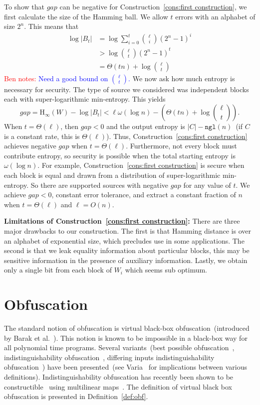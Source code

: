 \documentclass[11pt]{article}
\newcommand{\defref}[1]{\mbox{Definition~\ref{#1}}}
\newcommand{\consref}[1]{\mbox{Construction~\ref{#1}}}
\newcommand{\ngl}{\ensuremath{\mathtt{ngl}}\xspace}
\newcommand{\Hoo}{\mathrm{H}_\infty}
\newcommand{\authnote}[2]{{\textcolor{red}{\textsf{#1 notes: }\textcolor{blue}{ #2}}\marginpar{\textcolor{red}{\textbf{!!!!!}}}}}
\newcommand{\authnote}[2]{}
\newcommand{\bnote}[1]{{\authnote{Ben}{#1}}}
\begin{document}
To show that $gap$ can be negative for \consref{cons:first construction}, we first calculate the size of the Hamming ball.  We allow $t$ errors with an alphabet of size $2^n$.  This means that
\begin{align*}
\log |B_t| &= \log \sum_{i=0}^t {\ell \choose i} (2^n-1)^i\\
&> \log {\ell \choose t} (2^n-1)^t\\
&=\Theta(tn) + \log {\ell\choose t}
\end{align*}
\bnote{Need a good bound on ${\ell \choose t}$.}
We now ask how much entropy is necessary for security.  The type of source we considered was independent blocks each with super-logarithmic min-entropy.  This yields 
\[
gap = \Hoo(W) - \log |B_t| < \ell \omega(\log n) -\left( \Theta(t n) + \log {\ell \choose t}\right). 
\]
When $t =\Theta(\ell)$, then $gap<0$ and the output entropy is $|C| - \ngl(n)$~(if $C$ is a constant rate, this is $\Theta(\ell)$).
Thus, \consref{cons:first construction} achieves negative $gap$ when $t = \Theta(\ell)$.  Furthermore, not every block must contribute entropy, so security is possible when the total starting entropy is $\omega(\log n)$.  For example, \consref{cons:first construction} is secure when each block is equal and drawn from a distribution of super-logarithmic min-entropy.  So there are supported sources with negative $gap$ for any value of $t$.  We achieve $gap<0$, constant error tolerance, and extract a constant fraction of $n$ when $t = \Theta(\ell)$ and $\ell = O(n)$.

\textbf{Limitations of \consref{cons:first construction}:}  There are three major drawbacks to our construction.  The first is that Hamming distance is over an alphabet of exponential size, which precludes use in some applications.  The second is that we leak equality information about particular blocks, this may be sensitive information in the presence of auxiliary information.  Lastly, we obtain only a single bit from each block of $W_i$ which seems sub optimum.



\appendix
\section{Obfuscation}
\label{sec:obfuscation}
The standard notion of obfuscation is virtual black-box obfuscation~(introduced by Barak et al.~\cite{barak2001possibility}).  This notion is known to be impossible in a black-box way for all polynomial time programs.  Several variants~(best possible obfuscation~\cite{goldwasser2007best}, indistinguishability obfuscation~\cite{barak2001possibility}, differing inputs indistinguishability obfuscation~\cite{barak2001possibility}) have been presented~(see Varia~\cite{varia2010studies} for implications between various definitions).  Indistinguishability obfuscation has recently been shown to be constructible~\cite{garg2013candidate} using multilinear maps~\cite{garg2013multilinear}.  The definition of virtual black box obfuscation is presented in \defref{def:obf}.
\end{document}
